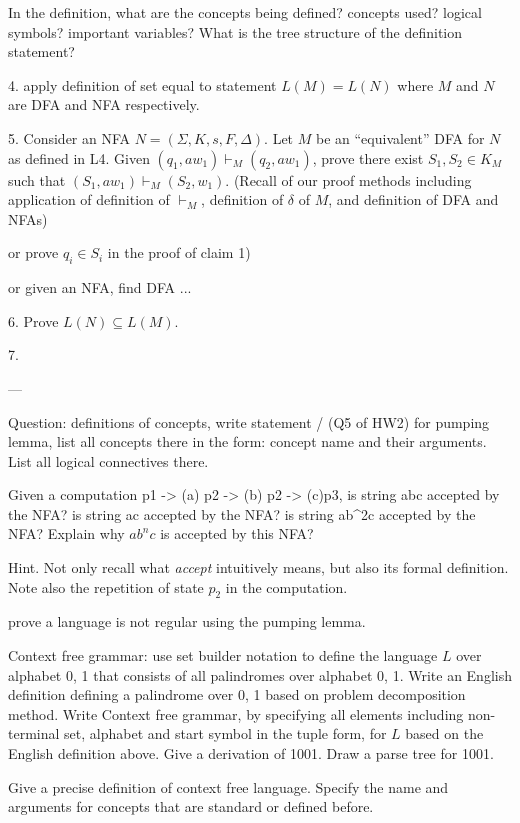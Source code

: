 \documentclass[12pt, letterpaper]{article}
\begin{document}
{		In the definition, what are the concepts being defined? concepts used? logical symbols?  important variables? What is the tree structure of the definition statement? 

  4. apply definition of set equal to statement $L(M) = L(N)$ where $M$ and $N$ are DFA and NFA respectively. 

  5. Consider an NFA $N = (\Sigma, K, s, F, \Delta)$. Let $M$ be an ``equivalent'' DFA for $N$ as defined in L4. Given $(q_1, aw_1) \vdash_M (q_2, aw_1)$, prove there exist $S_1, S_2 \in K_M$ such that $(S_1, aw_1) \vdash_M (S_2, w_1)$. (Recall of our proof methods including application of definition of $\vdash_M$, definition of $\delta$ of $M$, and definition of DFA and NFAs) 
  
  or prove $q_i \in S_i$ in the proof of claim 1)
  
  or given an NFA, find DFA ... 

 6. Prove $L(N) \subseteq L(M)$. 
 
 7. 
	

 --- 

 Question: definitions of concepts, write statement / (Q5 of HW2) 
for pumping lemma, list all concepts there in the form: concept name and their arguments. List all logical connectives there.  

Given a computation p1  -> (a) p2 -> (b) p2 -> (c)p3,   is string abc accepted by the NFA? is string ac accepted by the NFA?   is string ab^2c accepted by the NFA?   Explain why $ab^nc$ is accepted by this NFA? 

Hint. Not only recall what {\em accept} intuitively means, but also its formal definition. Note also the repetition of state $p_2$ in the computation. 

prove a language is not regular using the pumping lemma.

Context free grammar: use set builder notation to define the language $L$ over alphabet {0, 1} that consists of all palindromes over alphabet {0, 1}.  Write an English definition defining a palindrome over {0, 1} based on problem decomposition method. 
Write Context free grammar, by specifying all elements including non-terminal set, alphabet and start symbol in the tuple form, for $L$ based on the English definition above.  Give a derivation of 1001. 
Draw a parse tree for 1001. 


Give a precise definition of context free language. Specify the name and arguments for concepts that are standard or defined before. 

}
\end{document}

